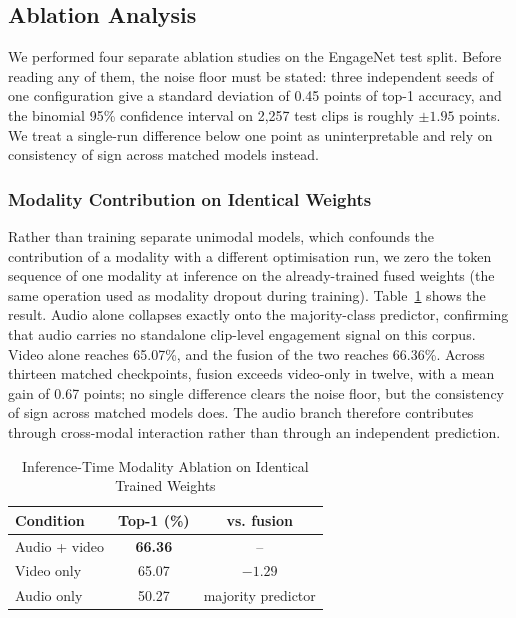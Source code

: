 \documentclass[journal]{IEEEtran}
\begin{document}
\subsection{Ablation Analysis}
\label{sec:ablation}

We performed four separate ablation studies on the EngageNet test split. Before reading any of them, the noise floor must be stated: three independent seeds of one configuration give a standard deviation of 0.45 points of top-1 accuracy, and the binomial 95\% confidence interval on 2,257 test clips is roughly $\pm 1.95$ points. We treat a single-run difference below one point as uninterpretable and rely on consistency of sign across matched models instead.

\subsubsection{Modality Contribution on Identical Weights}
Rather than training separate unimodal models, which confounds the contribution of a modality with a different optimisation run, we zero the token sequence of one modality at inference on the already-trained fused weights (the same operation used as modality dropout during training). Table~\ref{tab_modality} shows the result. Audio alone collapses exactly onto the majority-class predictor, confirming that audio carries no standalone clip-level engagement signal on this corpus. Video alone reaches 65.07\%, and the fusion of the two reaches 66.36\%. Across thirteen matched checkpoints, fusion exceeds video-only in twelve, with a mean gain of 0.67 points; no single difference clears the noise floor, but the consistency of sign across matched models does. The audio branch therefore contributes through cross-modal interaction rather than through an independent prediction.

\begin{table}[!t]
\renewcommand{\arraystretch}{1.3}
\caption{Inference-Time Modality Ablation on Identical Trained Weights}
\label{tab_modality}
\centering
\begin{tabular}{|l|c|c|}
\hline
Condition & Top-1 (\%) & vs. fusion\\
\hline
Audio + video & \textbf{66.36} & --\\
Video only & 65.07 & $-1.29$\\
Audio only & 50.27 & majority predictor\\
\hline
\end{tabular}
\end{table}
\end{document}

